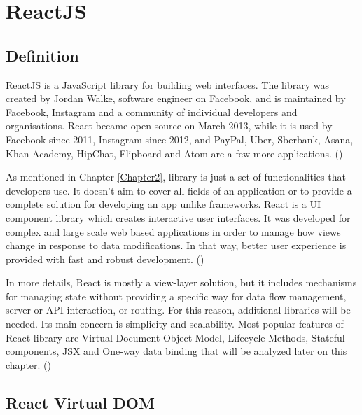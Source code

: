 
\chapter{ReactJS} %

\label{Chapter3} %

\section{Definition}
ReactJS is a JavaScript library for building web interfaces. The library was created by Jordan Walke, software engineer on Facebook, and is maintained by Facebook, Instagram and a community of individual developers and organisations. React became open source on March 2013, while it is used by Facebook since 2011, Instagram since 2012, and PayPal, Uber, Sberbank, Asana, Khan Academy, HipChat, Flipboard and Atom are a few more applications. (\cite{reactQuickly}) \par 

As mentioned in Chapter \ref{Chapter2}, library is just a set of functionalities that developers use. It doesn't aim to cover all fields of an application or to provide a complete solution for developing an app unlike frameworks. React is a UI component library which creates interactive user interfaces. It was developed for complex and large scale web based applications in order to manage how views change in response to data modifications. In that way, better user experience is provided with fast and robust development. (\cite{reactQuickly})  \par

In more details, React is mostly a view-layer solution, but it includes mechanisms for managing state without providing a specific way for data flow management, server or API interaction, or routing. For this reason, additional libraries will be needed. Its main concern is simplicity and scalability. Most popular features of React library are Virtual Document Object Model, Lifecycle Methods, Stateful components, JSX and One-way data binding that will be analyzed later on this chapter. (\cite{Reference13}) \par

\section{React Virtual DOM}

